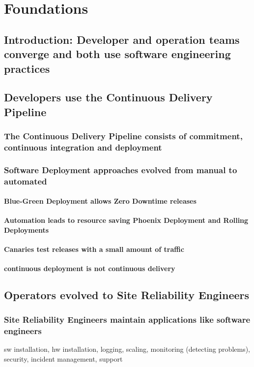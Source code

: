 \part{Foundations}

\chapter{Introduction: Developer and operation teams converge and both use software engineering practices}

\chapter{Developers use the Continuous Delivery Pipeline}
\section{The Continuous Delivery Pipeline consists of commitment, continuous integration and deployment}
\section{Software Deployment approaches evolved from manual to automated}
\subsection{Blue-Green Deployment allows Zero Downtime releases}
\subsection{Automation leads to resource saving Phoenix Deployment and Rolling Deployments}
\subsection{Canaries test releases with a small amount of traffic}
\subsection{continuous deployment is not continuous delivery}

\chapter{Operators evolved to Site Reliability Engineers}
\section{Site Reliability Engineers maintain applications like software engineers}
sw installation, hw installation, logging, scaling, monitoring (detecting problems), security, incident management, support
